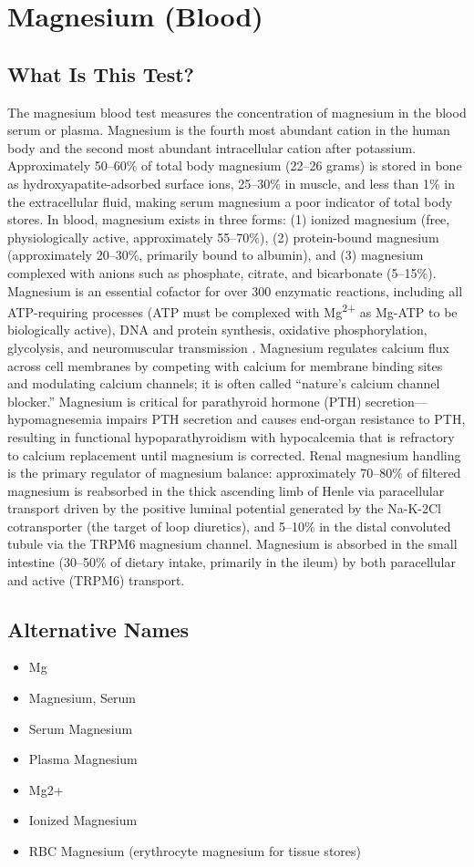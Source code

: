 \chapter{Magnesium (Blood)}

\section*{What Is This Test?}
The magnesium blood test measures the concentration of magnesium in the blood serum or plasma. Magnesium is the fourth most abundant cation in the human body and the second most abundant intracellular cation after potassium. Approximately 50--60\% of total body magnesium (22--26 grams) is stored in bone as hydroxyapatite-adsorbed surface ions, 25--30\% in muscle, and less than 1\% in the extracellular fluid, making serum magnesium a poor indicator of total body stores. In blood, magnesium exists in three forms: (1) ionized magnesium (free, physiologically active, approximately 55--70\%), (2) protein-bound magnesium (approximately 20--30\%, primarily bound to albumin), and (3) magnesium complexed with anions such as phosphate, citrate, and bicarbonate (5--15\%). Magnesium is an essential cofactor for over 300 enzymatic reactions, including all ATP-requiring processes (ATP must be complexed with Mg\textsuperscript{2+} as Mg-ATP to be biologically active), DNA and protein synthesis, oxidative phosphorylation, glycolysis, and neuromuscular transmission \cite{debaaij2015magnesium}. Magnesium regulates calcium flux across cell membranes by competing with calcium for membrane binding sites and modulating calcium channels; it is often called ``nature's calcium channel blocker.'' Magnesium is critical for parathyroid hormone (PTH) secretion---hypomagnesemia impairs PTH secretion and causes end-organ resistance to PTH, resulting in functional hypoparathyroidism with hypocalcemia that is refractory to calcium replacement until magnesium is corrected. Renal magnesium handling is the primary regulator of magnesium balance: approximately 70--80\% of filtered magnesium is reabsorbed in the thick ascending limb of Henle via paracellular transport driven by the positive luminal potential generated by the Na-K-2Cl cotransporter (the target of loop diuretics), and 5--10\% in the distal convoluted tubule via the TRPM6 magnesium channel. Magnesium is absorbed in the small intestine (30--50\% of dietary intake, primarily in the ileum) by both paracellular and active (TRPM6) transport.

\section*{Alternative Names}
\begin{itemize}
  \item Mg
  \item Magnesium, Serum
  \item Serum Magnesium
  \item Plasma Magnesium
  \item Mg2+
  \item Ionized Magnesium
  \item RBC Magnesium (erythrocyte magnesium for tissue stores)
\end{itemize}
